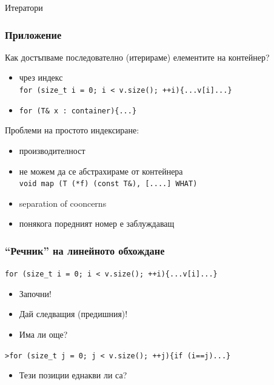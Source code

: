 \documentclass{beamer}
\begin{document}
\begin{frame}
\centerline{Итератори}
\end{frame}

\begin{frame}[fragile]
  \frametitle{Приложение}

  Как достъпваме последователно (итерираме) елементите на контейнер?
  \begin{itemize}
    \item чрез индекс \\
          \verb#for (size_t i = 0; i < v.size(); ++i){...v[i]...}#
    \item \verb#for (T& x : container){...}#
  \end{itemize}
  Проблеми на простото индексиране:
  \begin{itemize}
    \item производителност
    \item не можем да се абстрахираме от контейнера\\
    \verb#void map (T (*f) (const T&), [....] WHAT)#
    \item separation of cooncerns
    \item понякога поредният номер е заблуждаващ
  \end{itemize}
  
  
  \end{frame}

  
  \begin{frame}[fragile]
    \frametitle{``Речник'' на линейното обхождане}
  
    \verb#for (size_t i = 0; i < v.size(); ++i){...v[i]...}#

    \begin{itemize}
      \item Започни!
      \item Дай следващия (предишния)!
      \item Има ли още?
    \end{itemize}
    \verb#>for (size_t j = 0; j < v.size(); ++j){if (i==j)...}#   
    \begin{itemize}
      \item Тези позиции еднакви ли са?
    \end{itemize}
  \end{frame}
  
\end{document}

